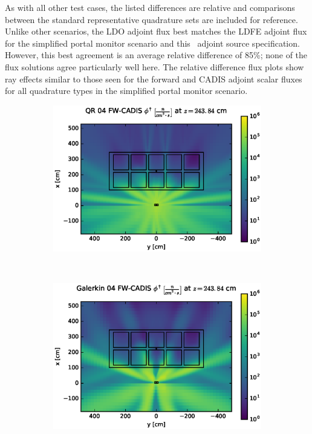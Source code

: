 \FloatBarrier
\noindent As with all other test cases, the listed differences are
relative and comparisons between the standard representative quadrature sets are included for
reference. Unlike other scenarios, the LDO adjoint flux best matches the LDFE adjoint flux for
the simplified portal monitor scenario and this \fwc\ adjoint source specification. However,
this best agreement is an average relative difference of 85\%; none of the flux solutions
agree particularly well here. The relative 
difference flux plots show ray effects similar to those seen for the forward and CADIS adjoint 
scalar fluxes for all quadrature types in the simplified portal monitor scenario. 

\clearpage
\begin{figure}[!htb]
\begin{subfigure}{\textwidth}
\centering
\includegraphics[max height=0.445\textheight]
{img/cargo-plots/fwc-adj/flux-qr04-slice.eps}
\end{subfigure}
\\
\begin{subfigure}{\textwidth}
\centering
\includegraphics[max height=0.445\textheight]
{img/cargo-plots/fwc-adj/flux-gkn04-slice.eps}
\end{subfigure}
\end{figure}
